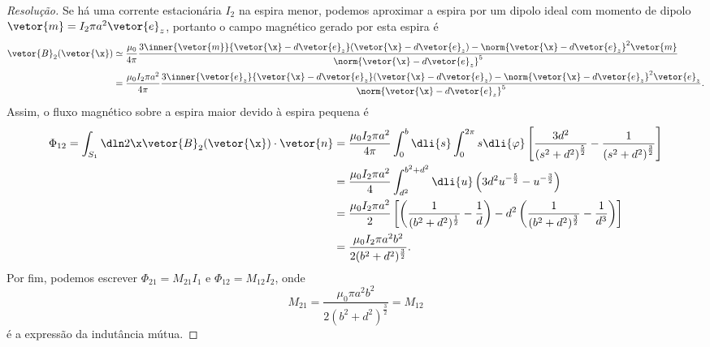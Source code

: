 \begin{proof}[Resolução]
    Se há uma corrente estacionária \(I_2\) na espira menor, podemos aproximar a espira por um dipolo ideal com momento de dipolo \(\vetor{m} = I_2 \pi a^2 \vetor{e}_z\), portanto o campo magnético gerado por esta espira é
    \begin{align*}
        \vetor{B}_2(\vetor{\x}) &\simeq \frac{\mu_0}{4\pi} \frac{3 \inner{\vetor{m}}{\vetor{\x} - d\vetor{e}_z}(\vetor{\x} - d\vetor{e}_z) - \norm{\vetor{\x} - d\vetor{e}_z}^2 \vetor{m}}{\norm{\vetor{\x} - d\vetor{e}_z}^5}\\
                                &= \frac{\mu_0 I_2 \pi a^2}{4\pi} \frac{3\inner{\vetor{e}_z}{\vetor{\x} - d\vetor{e}_z}(\vetor{\x} - d\vetor{e}_z) - \norm{\vetor{\x} - d\vetor{e}_z}^2 \vetor{e}_z}{\norm{\vetor{\x} - d\vetor{e}_z}^5}.
    \end{align*}
    Assim, o fluxo magnético sobre a espira maior devido à espira pequena é
    \begin{align*}
        \Phi_{12} = \int_{S_1}\dln2\x \vetor{B}_2(\vetor{\x})\cdot \vetor{n}
        &= \frac{\mu_0 I_2 \pi a^2}{4\pi} \int_{0}^{b} \dli{s} \int_0^{2\pi} s\dli{\varphi} \left[\frac{3d^2}{\left(s^2 + d^2\right)^{\frac52}} - \frac{1}{\left(s^2 + d^2\right)^{\frac32}}\right]\\
        &= \frac{\mu_0 I_2 \pi a^2}{4} \int_{d^2}^{b^2 + d^2}\dli{u} \left(3d^2 u^{-\frac52} - u^{-\frac32}\right)\\
        &= \frac{\mu_0 I_2 \pi a^2}{2}\left[\left(\frac{1}{(b^2 + d^2)^{\frac12}} - \frac1{d}\right)-d^2\left(\frac{1}{(b^2 + d^2)^{\frac32}} - \frac1{d^3}\right)\right]\\
        &= \frac{\mu_0 I_2 \pi a^2b^2}{2(b^2 + d^2)^{\frac32}}.
    \end{align*}
    Por fim, podemos escrever \(\Phi_{21} = M_{21} I_1\) e \(\Phi_{12} = M_{12}I_2\), onde
    \begin{equation*}
        M_{21} = \frac{\mu_0 \pi a^2b^2}{2(b^2 + d^2)^{\frac32}} = M_{12}
    \end{equation*}
    é a expressão da indutância mútua.
\end{proof}
